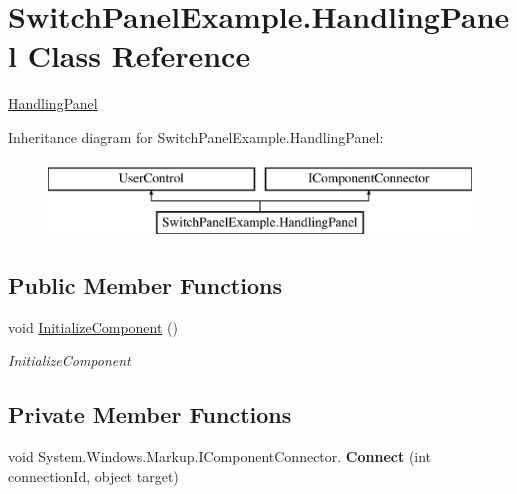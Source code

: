 \hypertarget{class_switch_panel_example_1_1_handling_panel}{}\section{Switch\+Panel\+Example.\+Handling\+Panel Class Reference}
\label{class_switch_panel_example_1_1_handling_panel}


\mbox{\hyperlink{class_switch_panel_example_1_1_handling_panel}{Handling\+Panel}}  


Inheritance diagram for Switch\+Panel\+Example.\+Handling\+Panel\+:\begin{figure}[H]
\begin{center}
\leavevmode
\includegraphics[height=2.000000cm]{da/d43/class_switch_panel_example_1_1_handling_panel}
\end{center}
\end{figure}
\subsection*{Public Member Functions}
\begin{DoxyCompactItemize}
\item 
void \mbox{\hyperlink{class_switch_panel_example_1_1_handling_panel_a2dd562be400b810f9e0655dc4fee01d8}{Initialize\+Component}} ()
\begin{DoxyCompactList}\small\item\em Initialize\+Component \end{DoxyCompactList}\end{DoxyCompactItemize}
\subsection*{Private Member Functions}
\begin{DoxyCompactItemize}
\item 
\mbox{\label{class_switch_panel_example_1_1_handling_panel_aac37fa1c92d8e5fd1610a6b74b184545}} 
void System.\+Windows.\+Markup.\+I\+Component\+Connector. {\bfseries Connect} (int connection\+Id, object target)
\end{DoxyCompactItemize}

